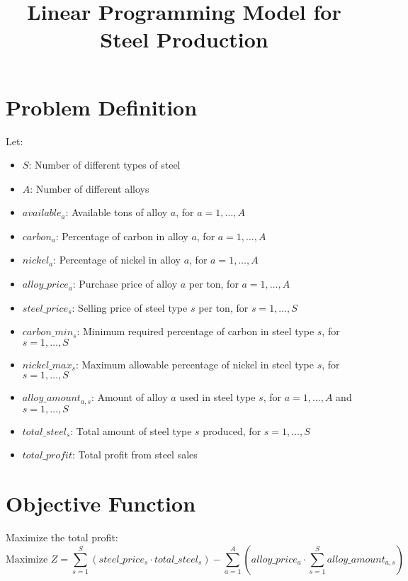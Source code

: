 \documentclass{article}
\begin{document}
\title{Linear Programming Model for Steel Production}
\author{}
\date{}
\maketitle

\section*{Problem Definition}

Let:
\begin{itemize}
    \item $S$: Number of different types of steel
    \item $A$: Number of different alloys
    \item $available_{a}$: Available tons of alloy $a$, for $a = 1, \ldots, A$
    \item $carbon_{a}$: Percentage of carbon in alloy $a$, for $a = 1, \ldots, A$
    \item $nickel_{a}$: Percentage of nickel in alloy $a$, for $a = 1, \ldots, A$
    \item $alloy\_price_{a}$: Purchase price of alloy $a$ per ton, for $a = 1, \ldots, A$
    \item $steel\_price_{s}$: Selling price of steel type $s$ per ton, for $s = 1, \ldots, S$
    \item $carbon\_min_{s}$: Minimum required percentage of carbon in steel type $s$, for $s = 1, \ldots, S$
    \item $nickel\_max_{s}$: Maximum allowable percentage of nickel in steel type $s$, for $s = 1, \ldots, S$
    \item $alloy\_amount_{a,s}$: Amount of alloy $a$ used in steel type $s$, for $a = 1, \ldots, A$ and $s = 1, \ldots, S$
    \item $total\_steel_{s}$: Total amount of steel type $s$ produced, for $s = 1, \ldots, S$
    \item $total\_profit$: Total profit from steel sales
\end{itemize}

\section*{Objective Function}

Maximize the total profit:
\[
\text{Maximize } Z = \sum_{s=1}^{S} (steel\_price_{s} \cdot total\_steel_{s}) - \sum_{a=1}^{A} (alloy\_price_{a} \cdot \sum_{s=1}^{S} alloy\_amount_{a,s})
\]
\end{document}
